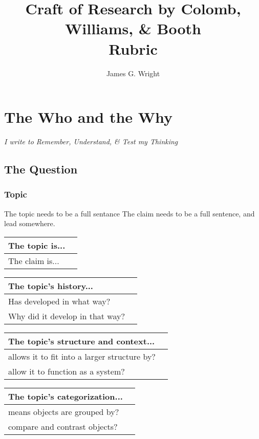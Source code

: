 \documentclass[10pt, a4paper]{article}
\begin{document}
\title{Craft of Research by Colomb, Williams, \& Booth\cite{booth2009craft}
	\\Rubric}
\author{James G. Wright }
\maketitle
\newpage
\section{The Who and the Why}
\emph{I write to Remember, Understand, \& Test my Thinking}
\subsection{The Question}
\subsubsection{Topic}
The topic needs to be a full sentance
The claim needs to be a full sentence, and lead somewhere.
\begin{center}
	\begin{tabular}{|l |l|}
		\hline
		The topic is... &\\
		\hline 
		The claim is... &\\ 
		\hline
	\end{tabular}
\end{center}
\begin{center}
	\begin{tabular}{|l |l|}
		\hline
		The topic's history... &\\
		\hline 
		 Has developed in what way?&\\ 
		\hline
		Why did it develop in that way?&\\
		\hline
	\end{tabular}
\end{center}
\begin{center}
	\begin{tabular}{|l |l|}
		\hline
		The topic's structure and context... &\\
		\hline 
		allows it to fit into a larger structure by?&\\ 
		\hline
		allow it to function as a system?&\\
		\hline
	\end{tabular}
\end{center}

\begin{center}
	\begin{tabular}{|l |l|}
		\hline
		The topic's categorization... &\\
		\hline 
		means objects are grouped by?&\\ 
		\hline
		compare and contrast objects?&\\
		\hline
	\end{tabular}
\end{center}
\end{document}

